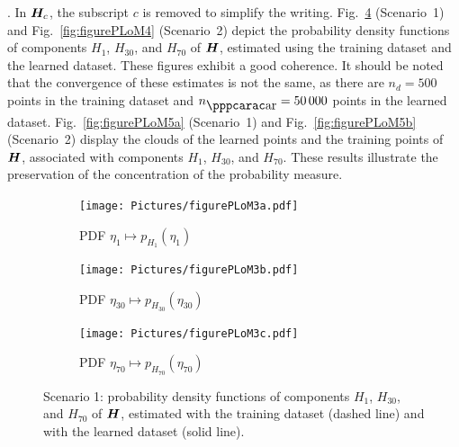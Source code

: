 . In ${\boldsymbol{H}}_c$,
the subscript $c$ is removed to simplify the writing. Fig.~\ref{fig:figurePLoM3} (Scenario~1) and Fig.~\ref{fig:figurePLoM4} (Scenario~2)
depict the  probability density functions of components $H_1$, $H_{30}$, and $H_{70}$ of ${\boldsymbol{H}}$, estimated using the training dataset and the learned dataset. These figures exhibit a good coherence. It should be noted that the convergence of these estimates is not the same, as there are $n_d=500$ points in the training dataset and $n_\ar =50\, 000$ points in the learned dataset.
Fig.~\ref{fig:figurePLoM5a} (Scenario~1) and Fig.~\ref{fig:figurePLoM5b} (Scenario~2) display the clouds of the learned points and the training points of ${\boldsymbol{H}}$, associated with components $H_1$, $H_{30}$, and $H_{70}$. These results illustrate the preservation of the concentration of the probability measure.
%
\begin{figure}[!htb]
    \centering
    \begin{subfigure}[b]{0.33\textwidth}
    \centering
        \texttt{[image: Pictures/figurePLoM3a.pdf]}
        \caption{PDF $\eta_1\mapsto p_{H_1}(\eta_1)$}
        \label{fig:figurePLoM3a}
    \end{subfigure}
    \centering
    \begin{subfigure}[b]{0.33\textwidth}
    \centering
        \texttt{[image: Pictures/figurePLoM3b.pdf]}
        \caption{PDF $\eta_{30}\mapsto p_{H_{30}}(\eta_{30})$}
        \label{fig:figurePLoM3b}
    \end{subfigure}
    \centering
    \begin{subfigure}[b]{0.33\textwidth}
    \centering
        \texttt{[image: Pictures/figurePLoM3c.pdf]}
        \caption{PDF $\eta_{70}\mapsto p_{H_{70}}(\eta_{70})$}
        \label{fig:figurePLoM3c}
    \end{subfigure}
    \caption{Scenario 1: probability density functions of components $H_1$, $H_{30}$, and $H_{70}$ of ${\boldsymbol{H}}$, estimated with the training dataset (dashed line) and with the learned dataset (solid line).}
    \label{fig:figurePLoM3}
\end{figure}
%
